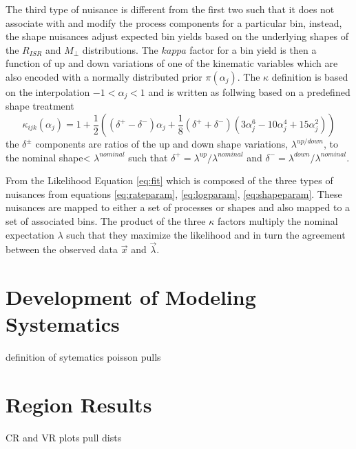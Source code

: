 The third type of nuisance is different from the first two such that it does not associate with and modify the process components for a particular bin, instead, the shape nuisances adjust expected bin yields based on the underlying shapes of the $R_{ISR}$ and $M_\perp$ distributions. The $kappa$ factor for a bin yield is then a function of up and down variations of one of the kinematic variables which are also encoded with a normally distributed prior $\pi(\alpha_j)$. The $\kappa$ definition is based on the interpolation $-1<\alpha_j<1$ and is written as follwing based on a predefined shape treatment \cite{combine shapes}
\begin{equation}
\label{eq:shapeparam}
\kappa_{ijk}(\alpha_j)= 1 + \frac{1}{2}((\delta^+ - \delta^-)\alpha_j + \frac{1}{8}(\delta^+ + \delta^-)(3\alpha_j^6-10\alpha_j^4+15\alpha_j^2))
\end{equation}
the $\delta^\pm$ components are ratios of the up and down shape variations, $\lambda^{up/down}$, to the nominal shape< $\lambda^{nominal}$ such that $\delta^+ = \lambda^{up}/\lambda^{nominal}$ and $\delta^- = \lambda^{down}/\lambda^{nominal}.$

From the Likelihood Equation \ref{eq:fit} which is composed of the three types of nuisances from equations \ref{eq:rateparam}, \ref{eq:logparam}, \ref{eq:shapeparam}. These nuisances are mapped to either a set of processes or shapes and also mapped to a set of associated bins. The product of the three $\kappa$ factors multiply the nominal expectation $\lambda$ such that they maximize the likelihood and in turn the agreement between the observed data $\vec{x}$ and $\vec{\lambda}$. 


\section{Development of Modeling Systematics}
definition of sytematics
poisson pulls

\section{Region Results}

CR and VR plots 
pull dists

